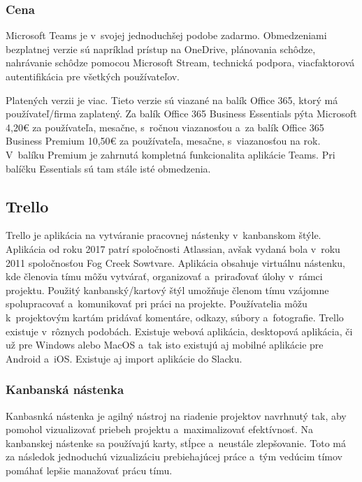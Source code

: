 \subsubsection{Cena}
\indent Microsoft Teams je v svojej jednoduchšej podobe zadarmo. Obmedzeniami bezplatnej verzie sú napríklad prístup na OneDrive, plánovania schôdze, nahrávanie schôdze pomocou Microsoft Stream, technická podpora, viacfaktorová autentifikácia pre všetkých používateľov. 

\indent Platených verzii je viac. Tieto verzie sú viazané na balík Office 365, ktorý má používateľ/firma zaplatený. Za balík Office 365 Business Essentials pýta Microsoft 4,20€ za používateľa, mesačne, s ročnou viazanosťou a za balík Office 365 Business Premium 10,50€ za používateľa, mesačne, s viazanosťou na rok. V balíku Premium je zahrnutá kompletná funkcionalita aplikácie Teams. Pri balíčku Essentials sú tam stále isté obmedzenia\cite{ms_teams}.

\subsection{Trello}
\indent Trello je aplikácia na vytváranie pracovnej nástenky v kanbanskom štýle. Aplikácia od roku 2017 patrí spoločnosti Atlassian, avšak vydaná bola v roku 2011 spoločnosťou Fog Creek Sowtvare. Aplikácia obsahuje virtuálnu nástenku, kde členovia tímu môžu vytvárať, organizovať a priraďovať úlohy v rámci projektu. Použitý kanbanský/kartový štýl umožňuje členom tímu vzájomne spolupracovať a komunikovať pri práci na projekte. Používatelia môžu k projektovým kartám pridávať komentáre, odkazy, súbory a fotografie. Trello existuje v rôznych podobách. Existuje webová aplikácia, desktopová aplikácia, či už pre Windows alebo MacOS a tak isto existujú aj mobilné aplikácie pre Android a iOS. Existuje aj import aplikácie do Slacku\cite{trello}.
\subsubsection{Kanbanská nástenka}
\indent Kanbasnká nástenka je agilný nástroj na riadenie projektov navrhnutý tak, aby pomohol vizualizovať priebeh projektu a maximalizovať efektívnosť. Na kanbanskej nástenke sa používajú karty, stĺpce a neustále zlepšovanie. Toto má za následok jednoduchú vizualizáciu prebiehajúcej práce a tým vedúcim tímov pomáhať lepšie manažovať prácu tímu\cite{kaban_board}. 

